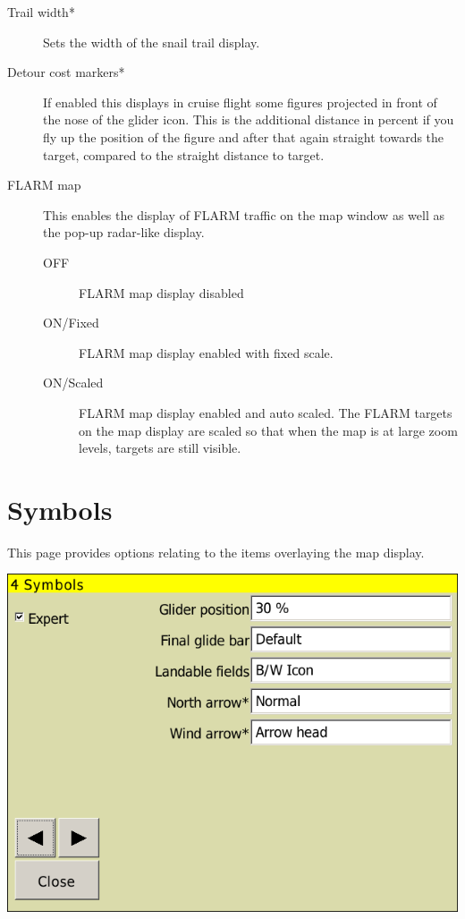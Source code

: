 \begin{description}
\item[Trail width*] \label{conf:trailwidth} Sets the width of the snail trail
display.
\item[Detour cost markers*]  If enabled this displays in cruise flight some
figures projected in front of the nose of the glider icon.  This is the
additional distance in percent if you fly up the position of the figure and
after that again straight towards the target, compared to the straight distance
to target.
\item[FLARM map]  \label{conf:flarm-on-map}This enables the display of FLARM
traffic on the map window as well as the pop-up radar-like display.
\begin{description}
\item[OFF]  FLARM map display disabled
\item[ON/Fixed]  FLARM map display enabled with fixed scale.
\item[ON/Scaled]  FLARM map display enabled and auto scaled. The FLARM targets on the map display are 
scaled so that when the map is at large zoom levels, targets are still visible.
\end{description}
\end{description}


\clearpage
\section{Symbols}\label{sec:symbols}

This page provides options relating to the items overlaying the map display.

\begin{center}
\includegraphics[angle=0,width=0.8\linewidth,keepaspectratio='true']{figures/config-symbols.png}
\end{center}

